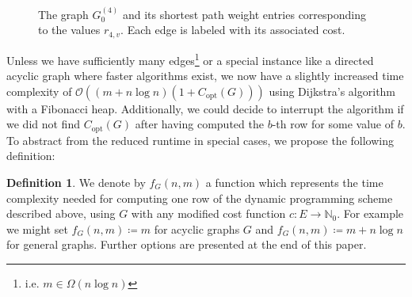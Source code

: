 \documentclass[a4paper, 10pt, oneside]{article}
\theoremstyle{plain}
\theoremstyle{definition}
\newtheorem{definition}[theorem]{Definition}
\numberwithin{equation}{section}
\newcommand{\bbN}{\mathbb{N}}
\newcommand{\calO}{\mathcal{O}}
\newcommand{\equalDef}{\coloneqq}
\newcommand{\compLeq}[1]{\calO\left( #1 \right)}
\newcommand{\compGeq}[1]{\Omega\left( #1 \right)}
\newcommand{\copt}{C_{\mathrm{opt}}}
\providecommand{\rowtime}[1]{f_{#1}}
\newcommand{\natZero}{\bbN_0}
\begin{document}
\begin{figure}[hbt]
\begin{center}
\caption{The graph $G_0^{(4)}$ and its shortest path weight entries corresponding to the values $r_{4, v}$. Each edge is labeled with its associated cost.} \label{fig:nnExModified}
\end{center}
\end{figure}

Unless we have sufficiently many edges\footnote{i.e. $m \in \compGeq{n \log n}$} or a special instance like a directed acyclic graph where faster algorithms exist, we now have a slightly increased time complexity of $\compLeq{(m + n \log n)(1 + \copt(G))}$ using Dijkstra's algorithm with a Fibonacci heap. Additionally, we could decide to interrupt the algorithm if we did not find $\copt(G)$ after having computed the $b$-th row for some value of $b$. To abstract from the reduced runtime in special cases, we propose the following definition:

\begin{definition} \label{def:rowcost}
We denote by $\rowtime{G}(n, m)$ a function which represents the time complexity needed for computing one row of the dynamic programming scheme described above, using $G$ with any modified cost function $c: E \to \natZero$. For example we might set $f_G(n, m) \equalDef m$ for acyclic graphs $G$ and $f_G(n, m) \equalDef m + n \log n$ for general graphs. Further options are presented at the end of this paper. %
\end{definition}
\end{document}
